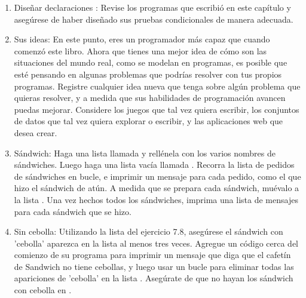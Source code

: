 \begin{enumerate}[6.5.1]
	Almacene los números del 1 al 9 en una lista.
	
	Recorra la lista (bucle).
	
	Utilice una cadena {} dentro del bucle para imprimir el final ordinal adecuado
	para cada número. Su salida debería decir  "$1\textsuperscript{\underline{o}}$, $2\textsuperscript{\underline{o}}$, 
	$3\textsuperscript{\underline{o}}$, $4\textsuperscript{\underline{o}}$, $5\textsuperscript{\underline{o}}$, $6\textsuperscript{\underline{o}}$, $7\textsuperscript{\underline{o}}$, $8 \textsuperscript{\underline{o}}$ y   $9\textsuperscript{\underline{o}}$", y cada resultado debe estar en una línea separada.
	
	
	\item  Diseñar declaraciones {}: Revise los programas que escribió en este capítulo y
	asegúrese de haber diseñado sus pruebas condicionales de manera adecuada.
	
	\item Sus ideas: En este punto, eres un programador más capaz que  cuando comenzó  este libro. Ahora que tienes una mejor idea de cómo son las situaciones del mundo real, como  se modelan en programas, es posible que esté pensando en algunas
	problemas que podrías resolver con tus propios programas. Registre cualquier idea nueva que tenga sobre algún problema que  quieras resolver, y a medida que sus habilidades de programación avancen puedas mejorar. Considere los juegos que tal vez quiera escribir, los conjuntos de datos que tal vez quiera explorar o escribir, y las aplicaciones web que desea crear.
	
	
	\item  Sándwich: Haga una lista llamada {} y rellénela con los  varios nombres de
	sándwiches. Luego haga una lista vacía llamada {}. 
	Recorra la lista  de pedidos de sándwiches en bucle, e imprimir un mensaje para cada pedido, 
	como el que hizo el  sándwich de atún. A medida que se prepara cada sándwich, muévalo a la
	lista {}. Una vez hechos todos los sándwiches, imprima una lista de mensajes para cada sándwich que se hizo.
	
	\item  Sin cebolla: Utilizando la lista {} del ejercicio 7.8, asegúrese
	el sándwich con 'cebolla' aparezca  en la lista al menos tres veces. Agregue un código cerca del comienzo de su programa
	para imprimir un mensaje que diga que el cafetín de Sandwich  no tiene cebollas, y luego usar un bucle {} para eliminar todas las apariciones de 'cebolla' en la lista  {}. Asegúrate de que no hayan los sándwich con cebolla	en  {}.
	

\end{enumerate}
